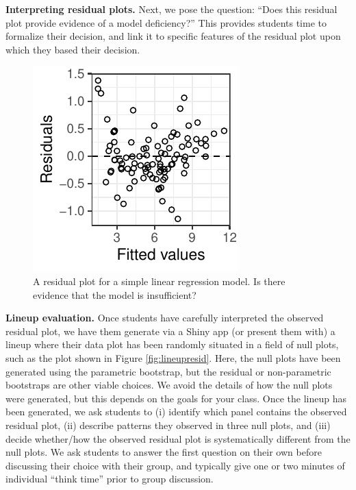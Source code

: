 \documentclass[12pt]{article}
\begin{document}
\textbf{Interpreting residual plots.} Next, we pose the question: ``Does
this residual plot provide evidence of a model deficiency?'' This
provides students time to formalize their decision, and link it to
specific features of the residual plot upon which they based their
decision.

\begin{figure}

{\centering \includegraphics{observed_residual} 

}

\caption{\label{fig:residplot} A residual plot for a simple linear regression model. Is there evidence that the model is insufficient?}\label{fig:residual plot}
\end{figure}

\textbf{Lineup evaluation.} Once students have carefully interpreted the
observed residual plot, we have them generate via a Shiny app (or
present them with) a lineup where their data plot has been randomly
situated in a field of null plots, such as the plot shown in Figure
\ref{fig:lineupresid}. Here, the null plots have been generated using
the parametric bootstrap, but the residual or non-parametric bootstraps
are other viable choices. We avoid the details of how the null plots
were generated, but this depends on the goals for your class. Once the
lineup has been generated, we ask students to (i) identify which panel
contains the observed residual plot, (ii) describe patterns they
observed in three null plots, and (iii) decide whether/how the observed
residual plot is systematically different from the null plots. We ask
students to answer the first question on their own before discussing
their choice with their group, and typically give one or two minutes of
individual ``think time'' prior to group discussion.
\end{document}
